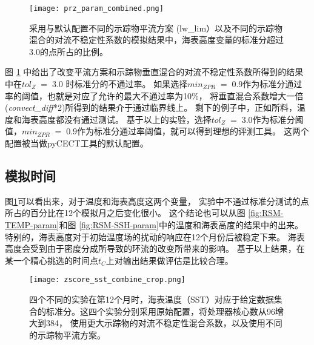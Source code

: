 \begin{figure} 
\centering
\texttt{[image: prz\_param\_combined.png]}
\caption{ 
  采用与默认配置不同的示踪物平流方案 (lw\_lim）以及不同的示踪物混合的对流不稳定性系数的模拟结果中，海表高度变量的标准分超过3.0的点所占的比例。}
\label {fig:PRZ-temp-param}
\end{figure}

   
图 \ref{fig:PRZ-temp-param} 中给出了改变平流方案和示踪物垂直混合的对流不稳定性系数所得到的结果中在$tol_{Z} \; = \; 3.0$ 时标准分的不通过率。
如果选择$min_{ZPR} \; = \; 0.9$作为标准分通过率的阈值，也就是对应了允许的最大不通过率为10\%， 将垂直混合系数增大一倍(\textit{convect\_diff}*2)所得到的结果介于通过临界线上。
剩下的例子中，正如所料，温度和海表高度都没有通过测试。 
基于以上的实验，选择$tol_{Z} \; = \; 3.0$作为标准分阈值，$min_{ZPR} \; = \; 0.9$作为标准分通过率阈值，就可以得到理想的评测工具。
这两个配置被当做pyCECT工具的默认配置。 


 \subsection{模拟时间}\label{verify:time}
 
图\ref{fig:PRZ-temp-param}可以看出来，对于温度和海表高度这两个变量， 实验中不通过标准分测试的点所占的百分比在12个模拟月之后变化很小。
这个结论也可以从图 \ref{fig:RSM-TEMP-param}和图 \ref{fig:RSM-SSH-param}中的温度和海表高度的结果中的出来。 
特别的，海表高度对于初始温度场的扰动的响应在12个月份后被稳定下来。 
海表高度会受到由于密度分成所导致的环流的改变所带来的影响。
基于以上结果，在某一个精心挑选的时间点$t_C$上对输出结果做评估是比较合理。 

  
\begin{figure}
\centering
\texttt{[image: zscore\_sst\_combine\_crop.png]}
\caption{四个不同的实验在第12个月时，海表温度（SST）对应于给定数据集合的标准分。这四个实验分别采用原始配置，将处理器核心数从96增大到384， 使用更大示踪物的对流不稳定性混合系数，以及使用不同的示踪物平流方案。}
\label {fig:zscore-combine}
\end{figure}

